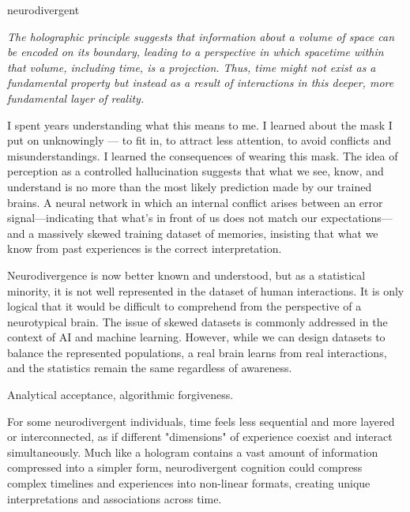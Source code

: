 


\begin{center}
\vspace*{\fill}
\Huge neurodivergent

\vspace{2cm}

\begin{flushright}
\large
\textit{The holographic principle suggests that information about a volume of space can be encoded on its boundary, leading to a perspective in which spacetime within that volume, including time, is a projection. Thus, time might not exist as a fundamental property but instead as a result of interactions in this deeper, more fundamental layer of reality.}
\end{flushright}

\vspace*{\fill}
\end{center}

\normalsize

I spent years understanding what this means to me. I learned about the mask I put on unknowingly — to fit in, to attract less attention, to avoid conflicts and misunderstandings. I learned the consequences of wearing this mask. The idea of perception as a controlled hallucination suggests that what we see, know, and understand is no more than the most likely prediction made by our trained brains. A neural network in which an internal conflict arises between an error signal—indicating that what’s in front of us does not match our expectations—and a massively skewed training dataset of memories, insisting that what we know from past experiences is the correct interpretation.

Neurodivergence is now better known and understood, but as a statistical minority, it is not well represented in the dataset of human interactions. It is only logical that it would be difficult to comprehend from the perspective of a neurotypical brain. The issue of skewed datasets is commonly addressed in the context of AI and machine learning. However, while we can design datasets to balance the represented populations, a real brain learns from real interactions, and the statistics remain the same regardless of awareness.

Analytical acceptance, algorithmic forgiveness.

For some neurodivergent individuals, time feels less sequential and more layered or interconnected, as if different "dimensions" of experience coexist and interact simultaneously. Much like a hologram contains a vast amount of information compressed into a simpler form, neurodivergent cognition could compress complex timelines and experiences into non-linear formats, creating unique interpretations and associations across time.


